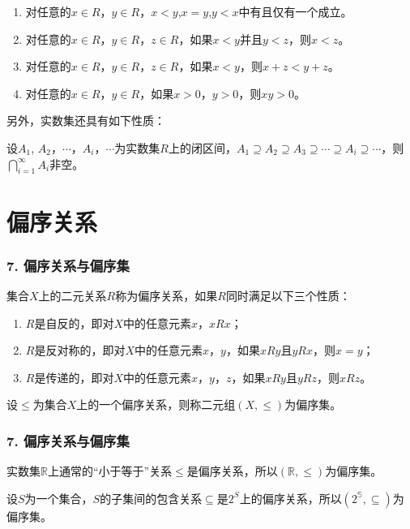 \documentclass{beamer}
\begin{document}
\begin{CJK*}{UTF8}{gbsn}
  \begin{frame}
        \begin{enumerate}
  \item 对任意的$x\in R$，$y\in R$，$x<y$,$x=y$,$y<x$中有且仅有一个成立。 
  \item 对任意的$x\in R$，$y\in R$，$z\in R$，如果$x<y$并且$y<z$，则$x<z$。
  \item 对任意的$x\in R$，$y\in R$，$z\in R$，如果$x<y$，则$x+z<y+z$。
  \item 对任意的$x\in R$，$y\in R$，如果$x>0$，$y>0$，则$xy>0$。
  \end{enumerate}
\end{frame}
\begin{frame}
      另外，实数集还具有如下性质：

  设$A_1$, $A_2$，$\cdots$，$A_i$，$\cdots$为实数集$R$上的闭区间，$A_1\supseteq A_2 \supseteq A_3 \supseteq \cdots \supseteq A_i \supseteq \cdots$，则$\bigcap_{i=1}^{\infty}A_i$非空。
\end{frame}
\section{偏序关系}
\begin{frame}
  \frametitle{7. 偏序关系与偏序集}
  \begin{Def}
    集合$X$上的二元关系$R$称为\alert{偏序关系}，如果$R$同时满足以下三个性质：
    \begin{enumerate}[(1)]
    \item $R$是自反的，即对$X$中的任意元素$x$，$xRx$；
    \item $R$是反对称的，即对$X$中的任意元素$x$，$y$，如果$xRy$且$yRx$，则$x=y$；
    \item $R$是传递的，即对$X$中的任意元素$x$，$y$，$z$，如果$xRy$且$yRz$，则$xRz$。
    \end{enumerate}
  \end{Def}\pause
    \begin{Def}
    设$\leq$为集合$X$上的一个偏序关系，则称二元组$(X,\leq)$为\alert{偏序集}。
  \end{Def}
\end{frame}

\begin{frame}
  \frametitle{7. 偏序关系与偏序集}
  \begin{Ex}
    实数集$\mathbb{R}$上通常的“小于等于”关系$\leq$是偏序关系，所以$(\mathbb{R},\leq)$为偏序集。
  \end{Ex}
  \begin{Ex}
    设$S$为一个集合，$S$的子集间的包含关系$\subseteq$是$2^S$上的偏序关系，所以$(2^{\mathbb{S}},\subseteq)$为偏序集。
  \end{Ex}
\end{frame}


\end{CJK*}
\end{document}

